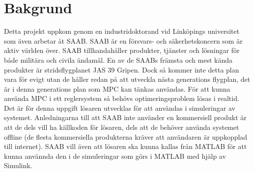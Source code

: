 \section{Bakgrund}    
Detta projekt uppkom genom en industridoktorand vid Linköpings universitet som även arbetar åt SAAB. SAAB är en försvars- och säkerhetskoncern som är aktiv världen över. SAAB  tillhandahåller produkter, tjänster och lösningar för både militära och civila ändamål. \citep{SAABbrief}
\newline
\newline
En av de SAABs främsta och mest kända produkter är stridsflygplanet JAS 39 Gripen. Dock så kommer inte detta plan vara för evigt utan de håller redan på att utveckla nästa generations flygplan, det är i denna generations plan som MPC kan tänkas användas. För att kunna använda MPC i ett reglersystem så behövs optimeringsproblem lösas i realtid. Det är för denna uppgift lösaren utvecklas för att användas i simuleringar av systemet. 
\newline
\newline
Anledningarna till att SAAB inte använder en kommersiell produkt är att de dels vill ha källkoden för lösaren, dels att de behöver använda systemet offline (de flesta kommersiella produkterna kräver att användaren är uppkopplad till internet).  
\newline
\newline
SAAB vill även att lösaren ska kunna kallas från MATLAB för att kunna använnda den i de simuleringar som görs i MATLAB med hjälp av Simulink. 
